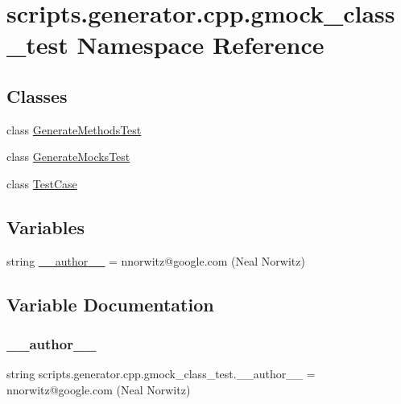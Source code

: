 \hypertarget{namespacescripts_1_1generator_1_1cpp_1_1gmock__class__test}{}\section{scripts.\+generator.\+cpp.\+gmock\+\_\+class\+\_\+test Namespace Reference}
\label{namespacescripts_1_1generator_1_1cpp_1_1gmock__class__test}
\subsection*{Classes}
\begin{DoxyCompactItemize}
\item 
class \mbox{\hyperlink{classscripts_1_1generator_1_1cpp_1_1gmock__class__test_1_1_generate_methods_test}{Generate\+Methods\+Test}}
\item 
class \mbox{\hyperlink{classscripts_1_1generator_1_1cpp_1_1gmock__class__test_1_1_generate_mocks_test}{Generate\+Mocks\+Test}}
\item 
class \mbox{\hyperlink{classscripts_1_1generator_1_1cpp_1_1gmock__class__test_1_1_test_case}{Test\+Case}}
\end{DoxyCompactItemize}
\subsection*{Variables}
\begin{DoxyCompactItemize}
\item 
string \mbox{\hyperlink{namespacescripts_1_1generator_1_1cpp_1_1gmock__class__test_a0196eab512474f7397dab1f75f50f241}{\+\_\+\+\_\+author\+\_\+\+\_\+}} = \textquotesingle{}nnorwitz@google.\+com (Neal Norwitz)\textquotesingle{}
\end{DoxyCompactItemize}


\subsection{Variable Documentation}
\mbox{\label{namespacescripts_1_1generator_1_1cpp_1_1gmock__class__test_a0196eab512474f7397dab1f75f50f241}} 
\subsubsection{\texorpdfstring{\_\_author\_\_}{\_\_author\_\_}}
{\footnotesize\ttfamily string scripts.\+generator.\+cpp.\+gmock\+\_\+class\+\_\+test.\+\_\+\+\_\+author\+\_\+\+\_\+ = \textquotesingle{}nnorwitz@google.\+com (Neal Norwitz)\textquotesingle{}\hspace{0.3cm}{\ttfamily [private]}}

